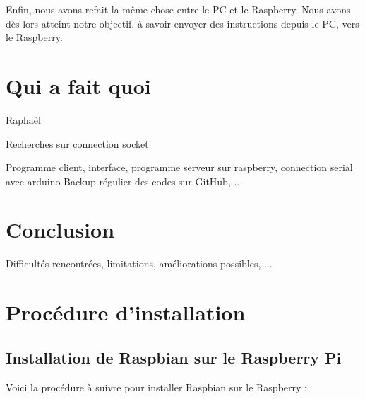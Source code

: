 \documentclass[12pt,a4paper]{report}
\begin{document}
\bigbreak

Enfin, nous avons refait la même chose entre le PC et le Raspberry. Nous avons dès lors atteint notre objectif, à savoir envoyer des instructions depuis le PC, vers le Raspberry.

\chapter{Qui a fait quoi}

Raphaël

Recherches sur connection socket

Programme client, interface, programme serveur sur raspberry, connection serial avec arduino
Backup régulier des codes sur GitHub, ...

\chapter{Conclusion}

Difficultés rencontrées, limitations, améliorations possibles, ...

\appendix

\chapter{Procédure d'installation}

\section{Installation de Raspbian sur le Raspberry Pi}

Voici la procédure à suivre pour installer Raspbian sur le Raspberry :
\end{document}
